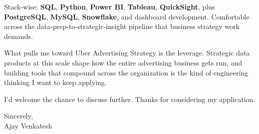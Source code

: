 \documentclass[letterpaper,11pt]{article}
\begin{document}
Stack-wise: \textbf{SQL}, \textbf{Python}, \textbf{Power BI}, \textbf{Tableau}, \textbf{QuickSight}, plus \textbf{PostgreSQL}, \textbf{MySQL}, \textbf{Snowflake}, and dashboard development. Comfortable across the data-prep-to-strategic-insight pipeline that business strategy work demands.

What pulls me toward Uber Advertising Strategy is the leverage. Strategic data products at this scale shape how the entire advertising business gets run, and building tools that compound across the organization is the kind of engineering thinking I want to keep applying.

I'd welcome the chance to discuss further. Thanks for considering my application.

\vspace{12pt}
Sincerely, \\
Ajay Venkatesh
\end{document}
